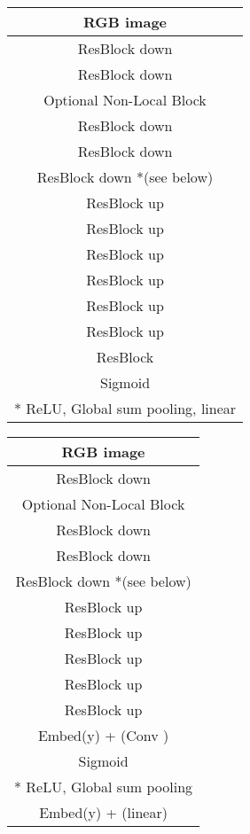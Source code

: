\documentclass[10pt,twocolumn,letterpaper]{article}
\begin{document}
\begin{table*}\vspace{0em}
	\setlength{\tabcolsep}{0.25em}
	\renewcommand{\arraystretch}{1.5}
	\centering



	\begin{minipage}[t]{.45\textwidth}
			\centering
	\begin{tabular}{c}
	
	\hline 	\hline
    RGB image  \\
	\hline
	ResBlock down  \\
	\hline
	ResBlock down  \\
	\hline
	Optional Non-Local Block  \\
	\hline
	ResBlock down  \\
	\hline
	ResBlock down  \\
	\hline
	ResBlock down  *(see below) \\
	\hline
	\hline
	ResBlock up  \\
	\hline
	ResBlock up  \\
	\hline
	ResBlock up  \\
	\hline
	ResBlock up  \\
	\hline
	ResBlock up  \\
	\hline
	ResBlock up  \\
	\hline
	ResBlock  \\
	\hline
	Sigmoid \\
	\hline 	\hline 
	* ReLU, Global sum pooling, linear	 \\
 \hline 	\hline
   \end{tabular}

\end{minipage} \hspace{0.5cm}
	\begin{minipage}[t]{.45\textwidth}	
			\centering
\begin{tabular}{c}

	\hline 	\hline
    RGB image  \\
	\hline
	ResBlock down  \\
	\hline
	Optional Non-Local Block  \\
	\hline
	ResBlock down  \\
	\hline
	ResBlock down  \\
	\hline
	ResBlock down  *(see below) \\
	\hline
	\hline
	ResBlock up  \\
	\hline
	ResBlock up  \\
	\hline
	ResBlock up  \\
	\hline
	ResBlock up  \\
	\hline
	ResBlock up  \\
	\hline
	Embed(y) + (Conv )	 \\
	\hline
	Sigmoid \\
	\hline 	\hline
	* ReLU, Global sum pooling \\
	\hline
	Embed(y) + (linear)	 	 \\
 \hline 	\hline 
     \end{tabular}


\end{minipage}
\end{table*}
\end{document}
